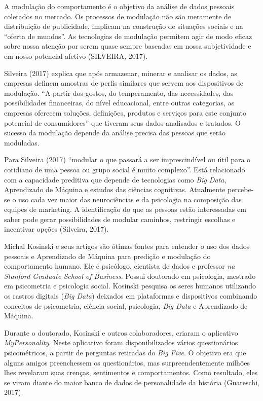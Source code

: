 A modulação do comportamento é o objetivo da análise de dados pessoais
coletados no mercado. Os processos de modulação não são meramente de
distribuição de publicidade, implicam na construção de situações sociais
e na ``oferta de mundos''. As tecnologias de modulação permitem agir de
modo eficaz sobre nossa atenção por serem quase sempre baseadas em nossa
subjetividade e em nosso potencial afetivo (SILVEIRA, 2017).

Silveira (2017) explica que após armazenar, minerar e analisar os dados,
as empresas definem amostras de perfis similares que servem aos
dispositivos de modulação. ``A partir dos gostos, do temperamento, das
necessidades, das possibilidades financeiras, do nível educacional,
entre outras categorias, as empresas oferecem soluções, definições,
produtos e serviços para este conjunto potencial de consumidores'' que
tiveram seus dados analisados e tratados. O sucesso da modulação depende
da análise precisa das pessoas que serão moduladas.

Para Silveira (2017) ``modular o que passará a ser imprescindível ou
útil para o cotidiano de uma pessoa ou grupo social é muito complexo''.
Está relacionado com a capacidade preditiva que depende de tecnologias
como \emph{Big Data}, Aprendizado de Máquina e estudos das ciências
cognitivas. Atualmente percebe-se o uso cada vez maior das neurociências
e da psicologia na composição das equipes de marketing. A identificação
do que as pessoas estão interessadas em saber pode gerar possibilidades
de modular caminhos, restringir escolhas e incentivar opções (Silveira,
2017).

Michal Kosinski e seus artigos são ótimas fontes para entender o uso dos
dados pessoais e Aprendizado de Máquina para predição e modulação do
comportamento humano. Ele é psicólogo, cientista de dados e professor
\emph{na Stanford Graduate School of Business}. Possui doutorado em
psicologia, mestrado em psicometria e psicologia social. Kosinski
pesquisa os seres humanos utilizando os rastros digitais (\emph{Big
Data}) deixados em plataformas e dispositivos combinando conceitos de
psicometria, ciência social, psicologia, \emph{Big Data} e Aprendizado
de Máquina.

Durante o doutorado, Kosinski e outros colaboradores, criaram o
aplicativo \emph{MyPersonality}. Neste aplicativo foram disponibilizados
vários questionários psicométricos, a partir de perguntas retiradas do
\emph{Big Five}. O objetivo era que alguns amigos preenchessem os
questionários, mas surpreendentemente milhões lhes revelaram suas
crenças, sentimentos e comportamentos. Como resultado, eles se viram
diante do maior banco de dados de personalidade da história (Guareschi,
2017).

